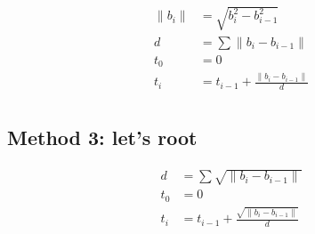 \documentclass{scrartcl}
\begin{document}
\begin{equation*}
\begin{split}
    \| b_i \| &= \sqrt{b_i^2 - b_{i-1}^2} \\
    d &= \sum \| b_i - b_{i-1} \| \\
    t_0 &= 0 \\
    t_i &= t_{i-1} + \frac{\| b_i - b_{i-1} \|}{d}\\
\end{split}
\end{equation*}

\subsection{Method 3: let's root}

\begin{equation*}
\begin{split}
    d &= \sum \sqrt{\| b_i - b_{i-1} \|} \\
    t_0 &= 0 \\
    t_i &= t_{i-1} + \frac{\sqrt{\| b_i - b_{i-1} \|}}{d}\\
\end{split}
\end{equation*}
\end{document}
